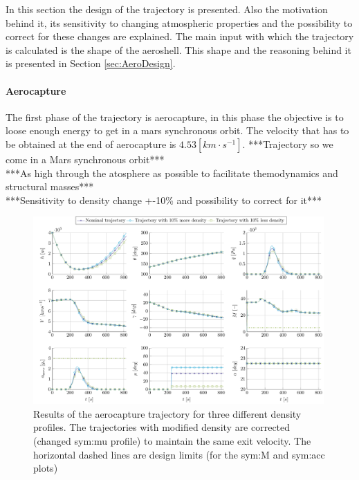 In this section the design of the trajectory is presented. Also the motivation behind it, its sensitivity to changing atmospheric properties and the possibility to correct for these changes are explained. The main input with which the trajectory is calculated is the shape of the aeroshell. This shape and the reasoning behind it is presented in Section \ref{sec:AeroDesign}.

\paragraph{Aerocapture}
The first phase of the trajectory is aerocapture, in this phase the objective is to loose enough energy to get in a mars synchronous orbit. The velocity that has to be obtained at the end of aerocapture is $4.53 \left[km \cdot s^{-1}\right]$. 
***Trajectory so we come in a Mars synchronous orbit***\\
***As high through the atosphere as possible to facilitate themodynamics and structural masses***\\

***Sensitivity to density change +-10\% and possibility to correct for it***\\
\begin{figure}
	\centering
	\includegraphics[width=0.99\textwidth]{Figure/Orbit/sensitivity_aerocapture.pdf}
	\caption{ Results of the aerocapture trajectory for three different density profiles. The trajectories with modified density are corrected (changed \gls{sym:mu} profile) to maintain the same exit velocity. The horizontal dashed lines are design limits (for the \gls{sym:M} and \gls{sym:acc} plots) }
	\label{fig:orbit_aerocapture_data}
\end{figure}

